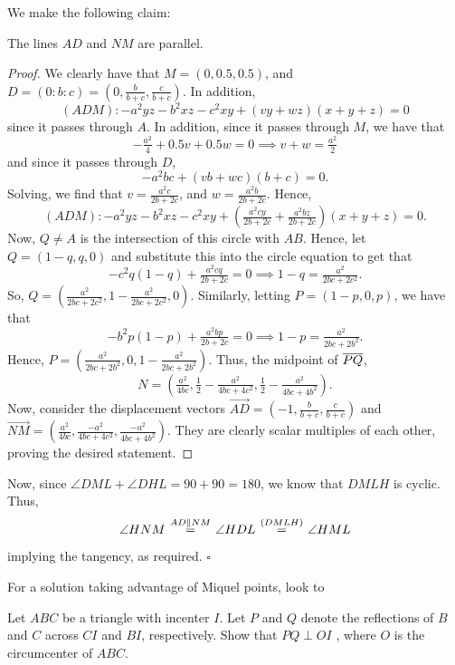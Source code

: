 \documentclass{article}
\begin{document}
We make the following claim:
\begin{claim*}
The lines $AD$ and $NM$ are parallel.
\end{claim*}
\begin{proof}
We clearly have that $M = (0, 0.5, 0.5)$, and $D = (0 : b : c) = \left(0, \tfrac{b}{b+c}, \tfrac{c}{b+c}\right)$. In addition,  \[(ADM) : -a^2yz-b^2xz-c^2xy+(vy+wz)(x+y+z) = 0\] since it passes through $A$. In addition, since it passes through $M$, we have that \[-\tfrac{a^2}{4}+0.5v+0.5w = 0 \implies v+w = \tfrac{a^2}{2}\] and since it passes through $D$, \[-a^2bc+(vb+wc)(b+c) = 0.\] Solving, we find that $v = \tfrac{a^2c}{2b+2c}$, and $w = \tfrac{a^2b}{2b+2c}$. Hence, \[(ADM) : -a^2yz-b^2xz-c^2xy+\left(\tfrac{a^2cy}{2b+2c}+\tfrac{a^2bz}{2b+2c}\right)(x+y+z) = 0.\] Now, $Q \neq A$ is the intersection of this circle with $AB$. Hence, let $Q = (1-q, q, 0)$ and substitute this into the circle equation to get that \[-c^2q(1-q)+\tfrac{a^2cq}{2b+2c} = 0 \implies 1-q = \tfrac{a^2}{2bc+2c^2}.\] So, $Q = \left(\tfrac{a^2}{2bc+2c^2}, 1-\tfrac{a^2}{2bc+2c^2}, 0\right)$. Similarly, letting $P = (1-p, 0, p)$, we have that \[-b^2p(1-p)+\tfrac{a^2bp}{2b+2c} = 0 \implies 1-p = \tfrac{a^2}{2bc+2b^2}.\] Hence, $P = \left(\tfrac{a^2}{2bc+2b^2}, 0, 1-\tfrac{a^2}{2bc+2b^2}\right)$. Thus, the midpoint of $\overline{PQ}$, \[N = \left(\tfrac{a^2}{4bc}, \tfrac{1}{2}-\tfrac{a^2}{4bc+4c^2}, \tfrac{1}{2}-\tfrac{a^2}{4bc+4b^2}\right).\] Now, consider the displacement vectors $\overrightarrow{AD} = \left(-1, \tfrac{b}{b+c}, \tfrac{c}{b+c}\right)$ and $\overrightarrow{NM} = \left(\tfrac{a^2}{4bc}, \tfrac{-a^2}{4bc+4c^2}, \tfrac{-a^2}{4bc+4b^2}\right)$. They are clearly scalar multiples of each other, proving the desired statement.
\end{proof}

Now, since $\angle DML + \angle DHL = 90 + 90 = 180$, we know that $DMLH$ is cyclic. Thus, \[\angle HNM \hspace{0.1em}\stackrel{AD \parallel NM}{=} \hspace{0.1em}\angle HDL \hspace{0.1em}\stackrel{(DMLH)}{=} \hspace{0.1em}\angle HML\] implying the tangency, as required. $\square$

\begin{remark*}
For a solution taking advantage of Miquel points, look to 
\end{remark*}

\begin{problem}[7.41]{}
Let $ABC$ be a triangle with incenter $I$. Let $P$ and $Q$ denote the reflections of $B$ and $C$ across $CI$ and $BI$, respectively. Show that $PQ \perp OI$ , where $O$ is the circumcenter of $ABC$.
\end{problem}
\end{document}
